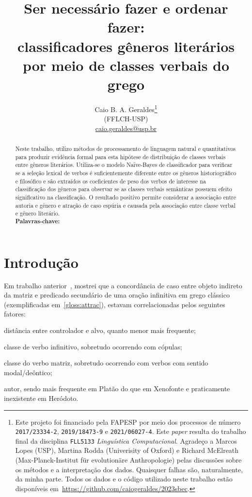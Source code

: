 \documentclass[a4paper,article,12pt,oneside]{memoir}
\title{Ser necessário fazer e ordenar fazer:\\{\Large{} classificadores gêneros literários por meio de classes verbais do grego}}
\author{Caio B. A. Geraldes\thanks{Este projeto foi financiado pela FAPESP por meio dos processos de número \texttt{2017/23334-2}, \texttt{2019/18473-9} e \texttt{2021/06027-4}. Este \emph{paper} resulta do trabalho final da disciplina \texttt{FLL5133} \emph{Linguística Computacional}. Agradeço a Marcos Lopes (USP), Martina Rodda (\foreignlanguage{english}{Univerisity of Oxford}) e Richard McElreath (\foreignlanguage{german}{Max-Planck-Institut für evolutionäre Anthropologie}) pelas discussões sobre os métodos e a interpretação dos dados. Quaisquer falhas são, naturalmente, da minha parte. Todos os dados e o código utilizado neste trabalho estão disponíveis em~\url{https://github.com/caiogeraldes/2023sbec}.}\\{\normalsize(FFLCH-USP)\\\url{caio.geraldes@usp.br}}}
\begin{document}
\maketitle%

\begin{abstract}
 Neste trabalho, utilizo métodos de processamento de linguagem natural e quantitativos para produzir evidência formal para esta hipótese de distribuição de classes verbais entre gêneros literários. Utiliza-se o modelo Naïve-Bayes de classificador para verificar se a seleção lexical de verbos é suficientemente diferente entre os gêneros historiográfico e filosófico e são extraídos os coeficientes de peso dos verbos de interesse na classificação dos gêneros para observar se as classes verbais semânticas possuem efeito significativo na classificação. O resultado positivo permite considerar a associação entre autoria e gênero e atração de caso espúria e causada pela associação entre classe verbal e gênero literário.\\
 \noindent \textbf{Palavras-chave:} 
\end{abstract}

\chapter{Introdução}

Em trabalho anterior~\cite{Geraldes2020,Geraldes2021}, mostrei que a concordância de caso entre objeto indireto da matriz e predicado secundário de uma oração infinitiva em grego clássico (exemplificadas em~\ref{gloss:attrac}), estavam correlacionadas pelos seguintes fatores:
\begin{inparaenum}[(a)]
  \item distância entre controlador e alvo, quanto menor mais frequente;
  \item classe de verbo infinitivo, sobretudo ocorrendo com cópulas;
  \item classe do verbo matriz, sobretudo ocorrendo com verbos com sentido modal\slash{}deôntico;
  \item autor, sendo mais frequente em Platão do que em Xenofonte e praticamente inexistente em Heródoto.
\end{inparaenum}
\end{document}
